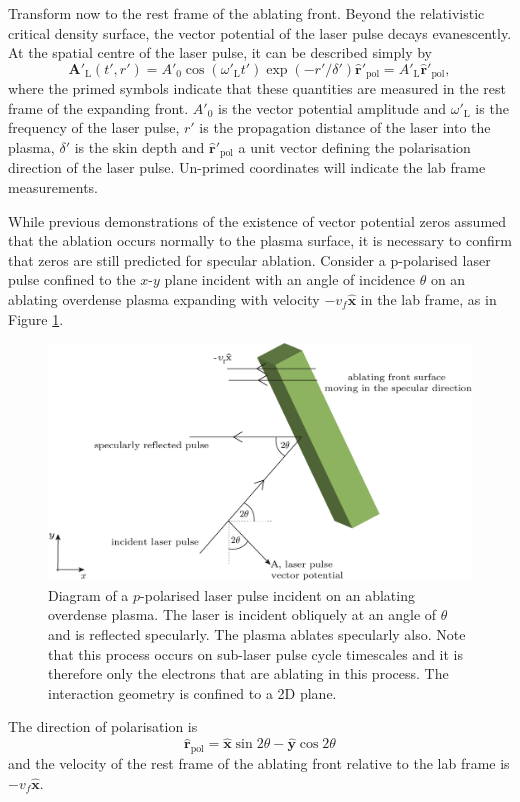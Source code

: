 Transform now to the rest frame of the ablating front. Beyond the relativistic critical density surface, the vector potential of the laser pulse decays evanescently. At the spatial centre of the laser pulse, it can be described simply by
\begin{equation}
	\mathbf{A}'_\mathrm{L}(t',r') = A'_0\cos(\omega'_\mathrm{L}t')\exp(-r'/\delta')\hat{\mathbf{r}}'_\mathrm{pol}= A'_\mathrm{L}\hat{\mathbf{r}}'_\mathrm{pol},
\end{equation}
where the primed symbols indicate that these quantities are measured in the rest frame of the expanding front. $A'_0$ is the vector potential amplitude and $\omega'_\mathrm{L}$ is the frequency of the laser pulse, $r'$ is the propagation distance of the laser into the plasma, $\delta'$ is the skin depth and $\hat{\mathbf{r}}'_\mathrm{pol}$ a unit vector defining the polarisation direction of the laser pulse. Un-primed coordinates will indicate the lab frame measurements.


While previous demonstrations of the existence of vector potential zeros assumed that the ablation occurs normally to the plasma surface, it is necessary to confirm that zeros are still predicted for specular ablation. Consider a p-polarised laser pulse confined to the $x$-$y$ plane incident with an angle of incidence $\theta$ on an ablating overdense plasma expanding with velocity $-v_f\hat{\mathbf{x}}$ in the lab frame, as in Figure \ref{fig:zvp_ablatingfront}.

\begin{figure}
	\centering
	\includegraphics[width=0.7\linewidth]{figures/zvp/zvp_ablating_front}
	\caption[Diagram of a $p$-polarised laser pulse incident on an ablating overdense plasma.]{Diagram of a $p$-polarised laser pulse incident on an ablating overdense plasma. The laser is incident obliquely at an angle of $\theta$ and is reflected specularly. The plasma ablates specularly also. Note that this process occurs on sub-laser pulse cycle timescales and it is therefore only the electrons that are ablating in this process. The interaction geometry is confined to a 2D plane.}
	\label{fig:zvp_ablatingfront}
\end{figure}
The direction of polarisation is
\begin{equation}
	\hat{\mathbf{r}}_\mathrm{pol} = \hat{\mathbf{x}}\sin{2\theta} - \hat{\mathbf{y}}\cos{2\theta}
\end{equation}
and the velocity of the rest frame of the ablating front relative to the lab frame is $-v_f\hat{\mathbf{x}}$.

